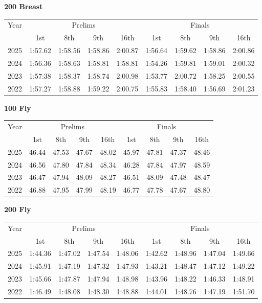 \textbf{200 Breast}

\begin{flushleft}
\begin{tabular}{|c|c|c|c|c|c|c|c|c|}
\hline
Year & \multicolumn{4}{c|}{Prelims} & \multicolumn{4}{c|}{Finals} \\
\cline{2-9}
& 1st & 8th & 9th & 16th & 1st & 8th & 9th & 16th \\
\hline
2025 & 1:57.62 & 1:58.56 & 1:58.86 & 2:00.87 & 1:56.64 & 1:59.62 & 1:58.86 & 2:00.86 \\
2024 & 1:56.36 & 1:58.63 & 1:58.81 & 1:58.81 & 1:54.26 & 1:59.81 & 1:59.01 & 2:00.32 \\
2023 & 1:57:38 & 1:58.37 & 1:58.74 & 2:00.98 & 1:53.77 & 2:00.72 & 1:58.25 & 2:00.55 \\
2022 & 1:57.27 & 1:58.88 & 1:59.22 & 2:00.75 & 1:55.83 & 1:58.40 & 1:56.69 & 2:01.23 \\
\hline
\end{tabular}
\end{flushleft}

\textbf{100 Fly}

\begin{flushleft}
\begin{tabular}{|c|c|c|c|c|c|c|c|c|}
\hline
Year & \multicolumn{4}{c|}{Prelims} & \multicolumn{4}{c|}{Finals} \\
\cline{2-9}
& 1st & 8th & 9th & 16th & 1st & 8th & 9th & 16th \\
\hline
2025 & 46.44 & 47.53 & 47.67 & 48.02 & 45.97 & 47.81 & 47.37 & 48.46 \\
2024 & 46.56 & 47.80 & 47.84 & 48.34 & 46.28 & 47.84 & 47.97 & 48.59 \\
2023 & 46.47 & 47.94 & 48.09 & 48.27 & 46.51 & 48.09 & 47.48 & 48.47 \\
2022 & 46.88 & 47.95 & 47.99 & 48.19 & 46.77 & 47.78 & 47.67 & 48.80 \\
\hline
\end{tabular}
\end{flushleft}

\textbf{200 Fly}

\begin{flushleft}
\begin{tabular}{|c|c|c|c|c|c|c|c|c|}
\hline
Year & \multicolumn{4}{c|}{Prelims} & \multicolumn{4}{c|}{Finals} \\
\cline{2-9}
& 1st & 8th & 9th & 16th & 1st & 8th & 9th & 16th \\
\hline
2025 & 1:44.36 & 1:47.02 & 1:47.54 & 1:48.06 & 1:42.62 & 1:48.96 & 1:47.04 & 1:49.66 \\
2024 & 1:45.91 & 1:47.19 & 1:47.32 & 1:47.93 & 1:43.21 & 1:48.47 & 1:47.12 & 1:49.22 \\
2023 & 1:45.66 & 1:47.87 & 1:47.94 & 1:48.98 & 1:43.96 & 1:48.22 & 1:46.33 & 1:48.91 \\
2022 & 1:46.49 & 1:48.08 & 1:48.30 & 1:48.88 & 1:44.01 & 1:48.76 & 1:47.19 & 1:51.70 \\
\hline
\end{tabular}
\end{flushleft}

